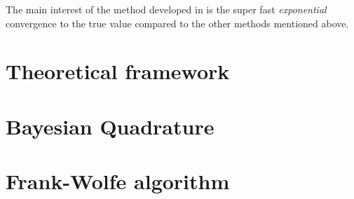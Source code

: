   The main interest of the method developed in \cite{FWBQ} is the super fast
  \textit{exponential} convergence to the true value compared to the other methods mentioned above.

\section{Theoretical framework}


\section{Bayesian Quadrature}
\label{sec:BQ}

\section{Frank-Wolfe algorithm}
\label{sec:FW}
